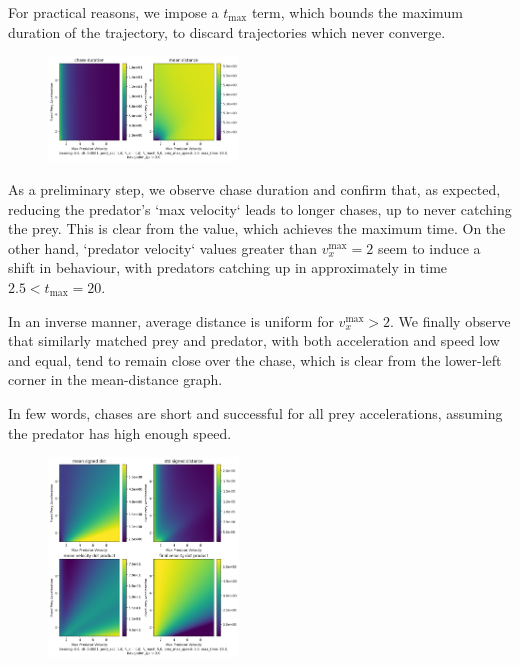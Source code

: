 \documentclass[10pt, twocolumn]{article}
\begin{document}
          For practical reasons, we impose a $t_{\text{max}}$ term, which bounds the maximum duration of the trajectory, to discard trajectories which never converge.

          \begin{figure}[H]
            \centering
            \includegraphics[width=0.45\textwidth]{figures/phase_duration_distance.png}
            \label{fig:phaseplot1}
          \end{figure}

          As a preliminary step, we observe chase duration and confirm that, as expected, reducing the predator's `max velocity` leads to longer chases, up to never catching the prey. This is clear from the value, which achieves the maximum time. On the other hand, `predator velocity` values greater than $v_x^{\text{max}}=2$ seem to induce a shift in behaviour, with predators catching up in approximately in time $2.5 < t_{\text{max}} = 20$.

          In an inverse manner, average distance is uniform for $v_x^{\text{max}}>2$. We finally observe that similarly matched prey and predator, with both acceleration and speed low and equal, tend to remain close over the chase, which is clear from the lower-left corner in the mean-distance graph.

          In few words, chases are short and successful for all prey accelerations, assuming the predator has high enough speed.

          \begin{figure}[H]
            \centering
            \includegraphics[width=0.45\textwidth]{figures/phase_avg_dist_dot.png}
            \label{fig:phaseplot2}
          \end{figure}
\end{document}
